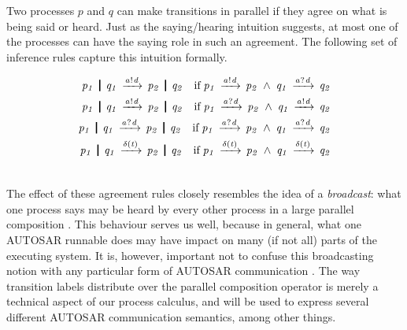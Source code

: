\documentclass[10pt,conference]{IEEEtran}
\begin{document}
Two processes $p$ and $q$ can make transitions in parallel if they agree on what is being said or heard. Just as the saying/hearing intuition suggests, at most one of the processes can have the saying role in such an agreement. The following set of inference rules capture this intuition formally.
{
\renewcommand{\Prule}[2]{#1 \quad \Pif\; #2\\}
\renewcommand{\Tstep}[3]{#1 \red{#2} #3}
\renewcommand\Pcomma{\;\wedge\;}

\begin{eqnarray}  \CombRed  \notag \end{eqnarray}
}


The effect of these agreement rules closely resembles the idea of a \emph{broadcast}: what one process says may be heard by every other process in a large parallel composition \cite{prasad:cbs}. This behaviour serves us well, because in general, what one AUTOSAR runnable does may have impact on many (if not all) parts of the executing system. It is, however, important not to confuse this broadcasting notion with any particular form of AUTOSAR communication \cite[ch.~4.2]{AR:SWC}. The way transition labels distribute over the parallel composition operator is merely a technical aspect of our process calculus, and will be used to express several different AUTOSAR communication semantics, among other things.
\end{document}

